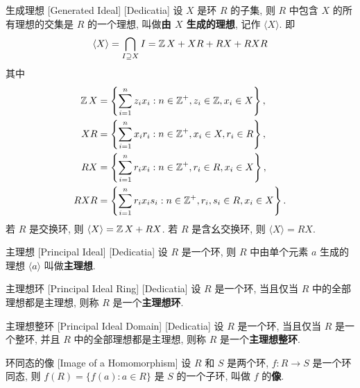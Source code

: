         \begin{dfn}
            {生成理想}
            [Generated Ideal]
            [Dedicatia]
            设 \(X\) 是环 \(R\) 的子集, 则 \(R\) 中包含 \(X\) 的所有理想的交集是 \(R\) 的一个理想, 叫做\textbf{由 \(X\) 生成的理想}, 记作 \(\langle X\rangle\). 即
            \[\langle X\rangle = \bigcap_{I \supseteq X} I = \operatorname{\mathbb{Z}} X+XR+RX+RXR\]
            其中
            \begin{align*}
                \operatorname{\mathbb{Z}} X &= \left\{\sum_{i=1}^{n} z_i x_i: n\in\operatorname{\mathbb{Z}}^+, z_i\in\operatorname{\mathbb{Z}}, x_i\in X\right\},\\
                XR &= \left\{\sum_{i=1}^{n} x_i r_i: n\in\operatorname{\mathbb{Z}}^+, x_i\in X, r_i\in R\right\},\\
                RX &= \left\{\sum_{i=1}^{n} r_i x_i: n\in\operatorname{\mathbb{Z}}^+, r_i\in R, x_i\in X\right\},\\
                RXR &= \left\{\sum_{i=1}^{n} r_i x_i s_i: n\in\operatorname{\mathbb{Z}}^+, r_i,s_i\in R, x_i\in X\right\}.
            \end{align*}
            若 \(R\) 是交换环, 则 \(\langle X\rangle = \operatorname{\mathbb{Z}} X + RX\). 若 \(R\) 是含幺交换环, 则 \(\langle X\rangle = RX\).
        \end{dfn}

        \begin{dfn}
            {主理想}
            [Principal Ideal]
            [Dedicatia]
            设 \(R\) 是一个环, 则 \(R\) 中由单个元素 \(a\) 生成的理想 \(\langle a\rangle\) 叫做\textbf{主理想}.
        \end{dfn}

        \begin{dfn}
            {主理想环}
            [Principal Ideal Ring]
            [Dedicatia]
            设 \(R\) 是一个环, 当且仅当 \(R\) 中的全部理想都是主理想, 则称 \(R\) 是一个\textbf{主理想环}.
        \end{dfn}

        \begin{dfn}
            {主理想整环}
            [Principal Ideal Domain]
            [Dedicatia]
            设 \(R\) 是一个环, 当且仅当 \(R\) 是一个整环, 并且 \(R\) 中的全部理想都是主理想, 则称 \(R\) 是一个\textbf{主理想整环}.
        \end{dfn}

        \begin{dfn}
            {环同态的像}
            [Image of a Homomorphism]
            设 \(R\) 和 \(S\) 是两个环, \(f:R\to S\) 是一个环同态, 则 \(f(R)=\{f(a): a\in R\}\) 是 \(S\) 的一个子环, 叫做 \(f\) 的\textbf{像}.
        \end{dfn}

